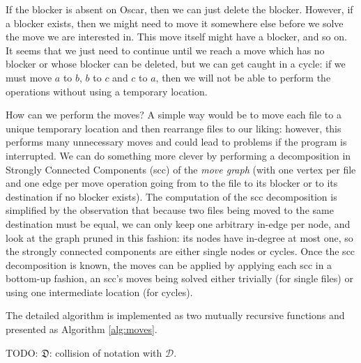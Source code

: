 \documentclass[11pt]{llncs}
\newcommand{\SetD}{\mathcal{D}}
\begin{document}
If the blocker is absent on Oscar, then we can just delete the blocker. However, if a blocker exists, then we might need to move it somewhere else before we solve the move we are interested in. This move itself might have a blocker, and so on. It seems that we just need to continue until we reach a move which has no blocker or whose blocker can be deleted, but we can get caught in a cycle: if we must move $a$ to $b$, $b$ to $c$ and $c$ to $a$, then we will not be able to perform the operations without using a temporary location.

How can we perform the moves? A simple way would be to move each file to a unique temporary location and then rearrange files to our liking: however, this performs many unnecessary moves and could lead to problems if the program is interrupted. We can do something more clever by performing a decomposition in Strongly Connected Components ({\sc scc}) of the \textit{move graph} (with one vertex per file and one edge per move operation going from to the file to its blocker or to its destination if no blocker exists). The computation of the {\sc scc} decomposition is simplified by the observation that because two files being moved to the same destination must be equal, we can only keep one arbitrary in-edge per node, and look at the graph pruned in this fashion: its nodes have in-degree at most one, so the strongly connected components are either single nodes or cycles. Once the {\sc scc} decomposition is known, the moves can be applied by applying each {\sc scc} in a bottom-up fashion, an {\sc scc}'s moves being solved either trivially (for single files) or using one intermediate location (for cycles).

The detailed algorithm is implemented as two mutually recursive functions and presented as Algorithm \ref{alg:moves}.

TODO: $\mathfrak{D}$: collision of notation with $\SetD$.
\end{document}
